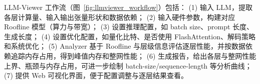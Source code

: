 LLM-Viewer 工作流（图~\ref{fig:llmviewer_workflow}）包括：
(1) 输入 LLM，提取各层计算量、输入输出张量形状和数据依赖；
(2) 输入硬件参数，构建对应 Roofline 模型（算力与带宽）；
(3) 设置推理配置，如 batch size、prompt 长度、生成长度；
(4) 设置优化配置，如量化比特、是否使用 FlashAttention、解码策略和系统优化；
(5) Analyzer 基于 Roofline 与层级信息评估逐层性能，并按数据依赖追踪内存占用，得到峰值内存和整网性能；
(6) 生成报告，给出各层与整网性能上界、瓶颈与内存占用，可进一步绘制 batch-size/sequence-length 等分析曲线；
(7) 提供 Web 可视化界面，便于配置调整与逐层结果查看。
